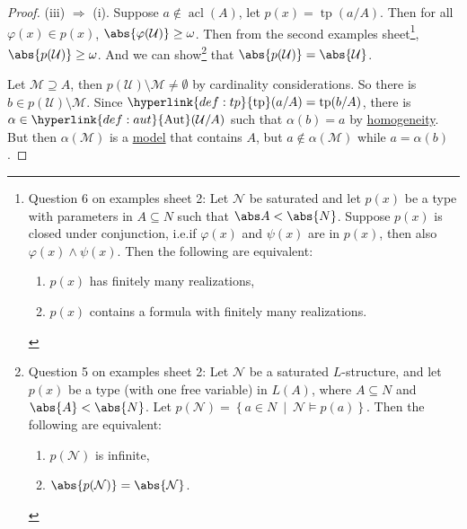 \documentclass{article}
\let\models\vDash
\DeclareMathOperator{\Aut}{Aut}
\DeclareMathOperator{\tp}{tp}
\DeclareMathOperator{\acl}{acl}
\begin{document}
\begin{proof}
  (iii) $\Rightarrow$ (i). Suppose $a \notin \acl(A)$, let $p(x) = \tp(a/A)$. Then for all $\varphi(x) \in p(x)$, $\abs{\varphi(\mathcal{U})} \geq \omega$.
  Then from the second examples sheet\footnote{Question 6 on examples sheet 2:
  Let $\mathcal{N}$ be saturated and let $p(x)$ be a type with parameters in $A \subseteq N$ such that $\abs A < \abs{N}$. Suppose $p(x)$ is closed under conjunction, i.e.\@ if $\varphi(x)$ and $\psi(x)$ are in $p(x)$, then also $\varphi(x) \land \psi(x)$. Then the following are equivalent:
  \begin{enumerate}[label=(\roman*)]
  \item $p(x)$ has finitely many realizations,
  \item $p(x)$ contains a formula with finitely many realizations.
  \end{enumerate}}, $\abs{p(\mathcal{U})} \geq \omega$.
  And we can show\footnote{\label{question:ex2q5} Question 5 on examples sheet 2: Let $\mathcal{N}$ be a saturated $L$-structure, and let $p(x)$ be a type (with one free variable) in $L(A)$, where $A \subseteq N$ and $\abs{A} < \abs{N}$. Let $p(\mathcal{N}) = \left\{ a\in N \ \middle|\ \mathcal{N} \models p(a) \right\}$. Then the following are equivalent: \begin{enumerate}[label=(\roman*)]
  \item $p(\mathcal{N})$ is infinite,
  \item $\abs{p(\mathcal{N})} = \abs{\mathcal{N}}$.
\end{enumerate}} that $\abs{p(\mathcal{U})} = \abs{\mathcal{U}}$.

  Let $\mathcal{M} \supseteq A$, then $p(\mathcal{U}) \setminus \mathcal{M} \neq \emptyset$ by cardinality considerations.
  So there is $b \in p(\mathcal{U}) \setminus \mathcal{M}$.
  Since $\hyperlink{def:tp}{\tp}(a/A) = \tp(b/A)$, there is $\alpha \in \hyperlink{def:aut}{\Aut}(\mathcal{U}/A)$ such that $\alpha(b) = a$ by \hyperlink{def:homogeneous}{homogeneity}.
  But then $\alpha(\mathcal{M})$ is a \hyperlink{def:model}{model} that contains $A$, but $a \notin \alpha(\mathcal{M})$ while $a = \alpha(b)$.
\end{proof}
\end{document}

